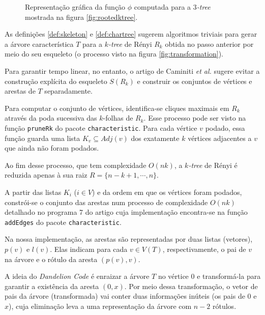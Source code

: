 \begin{algorithm}
\begin{step}
\begin{figure}
      \caption{Representação gráfica da função $\phi$ computada para a \emph{$3$-tree} mostrada na figura \ref{fig:rootedktree}.}
      \label{fig:phi}
    \end{figure}
  \end{step}

  \begin{step}
    As definições \ref{def:skeleton} e \ref{def:chartree} sugerem algoritmos triviais para gerar a árvore característica $T$ para a \emph{$k$-tree} de Rényi $R_k$ obtida no passo anterior por meio do seu esqueleto (o processo visto na figura \ref{fig:transformation}).

    Para garantir tempo linear, no entanto, o artigo de Caminiti \emph{et al.} \cite{caminiti} sugere evitar a construção explícita do esqueleto $S(R_k)$ e construir os conjuntos de vértices e arestas de $T$ separadamente.

    Para computar o conjunto de vértices, identifica-se cliques maximais em $R_k$ através da poda sucessiva das $k$-folhas de $R_k$. Esse processo pode ser visto na função {\tt pruneRk} do pacote {\tt characteristic}. Para cada vértice $v$ podado, essa função guarda uma lista $K_v \subseteq Adj(v)$ dos exatamente $k$ vértices adjacentes a $v$ que ainda não foram podados.

    Ao fim desse processo, que tem complexidade $O(nk)$, a \emph{$k$-tree} de Rényi é reduzida apenas à sua raiz $R = \{n-k+1, \cdots, n\}$.

    A partir das listas $K_i$ ($i \in V$) e da ordem em que os vértices foram podados, constrói-se o conjunto das arestas num processo de complexidade $O(nk)$ detalhado no programa 7 do artigo \cite{caminiti} cuja implementação encontra-se na função {\tt addEdges} do pacote {\tt characteristic}.

    Na nossa implementação, as arestas são representadas por duas listas (vetores), $p(v)$ e $l(v)$. Elas indicam para cada $v \in V(T)$, respectivamente, o pai de $v$ na árvore e o rótulo da aresta $(p(v), v)$.
  \end{step}

  \begin{step}
    A ideia do \emph{Dandelion Code} é enraizar a árvore $T$ no vértice $0$ e transformá-la para garantir a existência da aresta $(0, x)$. Por meio dessa transformação, o vetor de pais da árvore (transformada) vai conter duas informações inúteis (os pais de $0$ e $x$), cuja eliminação leva a uma representação da árvore com $n - 2$ rótulos.


\end{step}
\end{algorithm}
